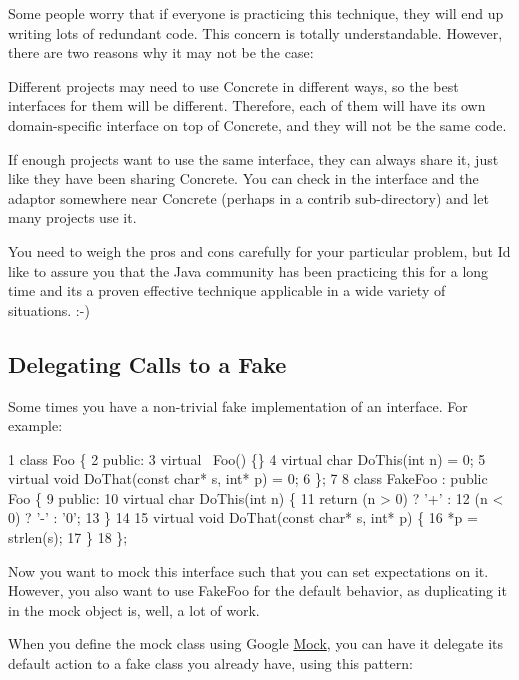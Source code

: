 Some people worry that if everyone is practicing this technique, they will end up writing lots of redundant code. This concern is totally understandable. However, there are two reasons why it may not be the case\+:


\begin{DoxyItemize}
\item Different projects may need to use {\ttfamily Concrete} in different ways, so the best interfaces for them will be different. Therefore, each of them will have its own domain-\/specific interface on top of {\ttfamily Concrete}, and they will not be the same code.
\item If enough projects want to use the same interface, they can always share it, just like they have been sharing {\ttfamily Concrete}. You can check in the interface and the adaptor somewhere near {\ttfamily Concrete} (perhaps in a {\ttfamily contrib} sub-\/directory) and let many projects use it.
\end{DoxyItemize}

You need to weigh the pros and cons carefully for your particular problem, but I\textquotesingle{}d like to assure you that the Java community has been practicing this for a long time and it\textquotesingle{}s a proven effective technique applicable in a wide variety of situations. \+:-\/)

\subsection*{Delegating Calls to a Fake}

Some times you have a non-\/trivial fake implementation of an interface. For example\+:


\begin{DoxyCode}
1 class Foo \{
2  public:
3   virtual ~Foo() \{\}
4   virtual char DoThis(int n) = 0;
5   virtual void DoThat(const char* s, int* p) = 0;
6 \};
7 
8 class FakeFoo : public Foo \{
9  public:
10   virtual char DoThis(int n) \{
11     return (n > 0) ? '+' :
12         (n < 0) ? '-' : '0';
13   \}
14 
15   virtual void DoThat(const char* s, int* p) \{
16     *p = strlen(s);
17   \}
18 \};
\end{DoxyCode}


Now you want to mock this interface such that you can set expectations on it. However, you also want to use {\ttfamily Fake\+Foo} for the default behavior, as duplicating it in the mock object is, well, a lot of work.

When you define the mock class using Google \hyperlink{class_mock}{Mock}, you can have it delegate its default action to a fake class you already have, using this pattern\+:


